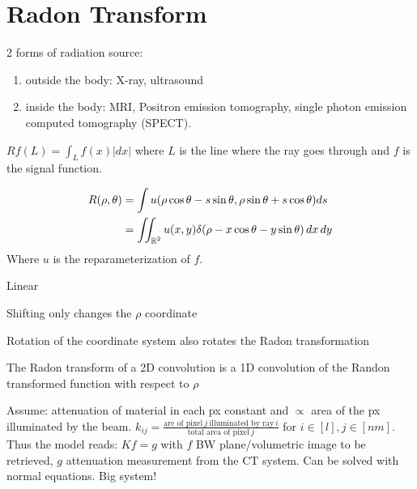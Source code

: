 \section{Radon Transform}

2 forms of radiation source:
\begin{enumerate}
  \item outside the body: X-ray, ultrasound
  \item inside the body: MRI, Positron emission tomography, single photon emission computed tomography (SPECT).
\end{enumerate}

\begin{definition}
  \(Rf(L) = \int_L f(x) |dx|\) where \(L\) is the line where the ray goes through and \(f\) is the signal function.
\end{definition}

\begin{definition}
  \begin{align*}
    R(\rho, \theta) & = \int u(\rho \cos \theta - s \sin \theta, \rho \sin \theta + s \cos \theta) ds \\
    & = \iint_{\operatorname{\mathbb{R}}^2} u(x, y) \delta(\rho - x \cos \theta -y \sin \theta) \,dx \,dy
  \end{align*}
  Where \(u\) is the reparameterization of \(f\).
\end{definition}

\begin{definition}[Properties]
  \begin{itemize*}
    \item Linear
    \item Shifting only changes the \(\rho\) coordinate
    \item Rotation of the coordinate system also rotates the Radon transformation
    \item The Radon transform of a 2D convolution is a 1D convolution of the Randon transformed function with respect to \(\rho\)
  \end{itemize*}
\end{definition}

\begin{algorithm}
  Assume: attenuation of material in each px constant and \(\propto\) area of the px illuminated by the beam.
  \(k_{ij} = \frac{\text{are of pixel} \ j \ \text{illuminated by ray} \ i}{\text{total area of pixel} \ j}\) for \(i \in [l], j \in [nm]\). Thus the model reads:
  \(Kf = g\) with \(f\) BW plane/volumetric image to be retrieved, \(g\) attenuation measurement from the CT system. Can be solved with normal equations. Big system!
\end{algorithm}


